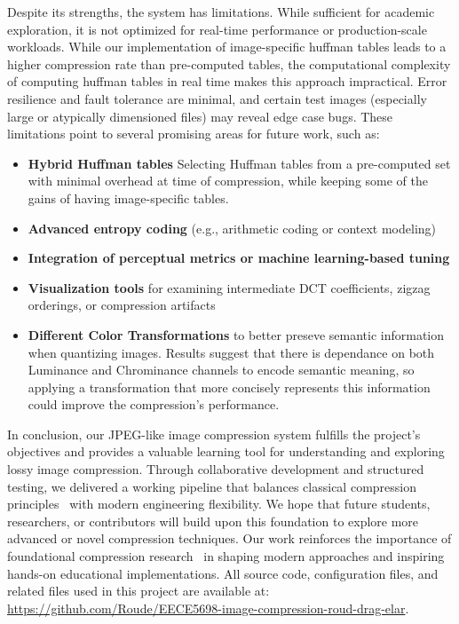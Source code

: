 Despite its strengths, the system has limitations. 
While sufficient for academic exploration, it is not optimized for real-time performance or production-scale workloads. While our implementation of image-specific huffman tables leads to a higher compression rate than pre-computed tables, the computational complexity of computing huffman tables in real time makes this approach impractical. Error resilience and fault tolerance are minimal, and certain test images (especially large or atypically dimensioned files) may reveal edge case bugs. These limitations point to several promising areas for future work, such as:

\begin{itemize}
    \item \textbf{Hybrid Huffman tables} Selecting Huffman tables from a pre-computed set with minimal overhead at time of compression, while keeping some of the gains of having image-specific tables.
    \item \textbf{Advanced entropy coding} (e.g., arithmetic coding or context modeling)
    \item \textbf{Integration of perceptual metrics or machine learning-based tuning}
    \item \textbf{Visualization tools} for examining intermediate DCT coefficients, zigzag orderings, or compression artifacts
    \item \textbf{Different Color Transformations} to better preseve semantic information when quantizing images. Results suggest that there is dependance on both Luminance and Chrominance channels to encode semantic meaning, so applying a transformation that more concisely represents this information could improve the compression's performance.
\end{itemize}

In conclusion, our JPEG-like image compression system fulfills the project’s objectives and provides a valuable learning tool for understanding and exploring lossy image compression. Through collaborative development and structured testing, we delivered a working pipeline that balances classical compression principles~\cite{jpegOverview2025} with modern engineering flexibility. We hope that future students, researchers, or contributors will build upon this foundation to explore more advanced or novel compression techniques. Our work reinforces the importance of foundational compression research~\cite{haines1992compression} in shaping modern approaches and inspiring hands-on educational implementations.
All source code, configuration files, and related files used in this project are available at: \url{https://github.com/Roude/EECE5698-image-compression-roud-drag-elar}.